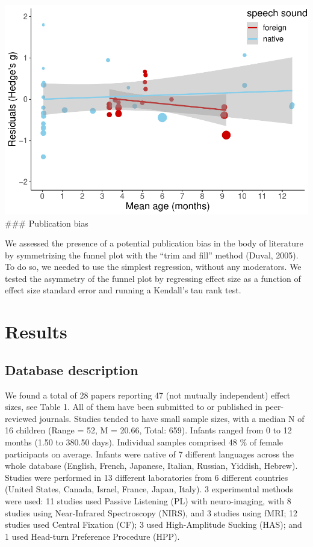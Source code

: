 \documentclass[man]{apa6}
\begin{document}
\includegraphics{MA_speech_pref_files/figure-latex/residuals-4.pdf}
\#\#\# Publication bias

We assessed the presence of a potential publication bias in the body of
literature by symmetrizing the funnel plot with the \enquote{trim and
fill} method (Duval, 2005). To do so, we needed to use the simplest
regression, without any moderators. We tested the asymmetry of the
funnel plot by regressing effect size as a function of effect size
standard error and running a Kendall's tau rank test.

\section{Results}\label{results}

\subsection{Database description}\label{database-description}

We found a total of 28 papers reporting 47 (not mutually independent)
effect sizes, see Table 1. All of them have been submitted to or
published in peer-reviewed journals. Studies tended to have small sample
sizes, with a median N of 16 children (Range = 52, M = 20.66, Total:
659). Infants ranged from 0 to 12 months (1.50 to 380.50 days).
Individual samples comprised 48 \% of female participants on average.
Infants were native of 7 different languages across the whole database
(English, French, Japanese, Italian, Russian, Yiddish, Hebrew). Studies
were performed in 13 different laboratories from 6 different countries
(United States, Canada, Israel, France, Japan, Italy). 3 experimental
methods were used: 11 studies used Passive Listening (PL) with
neuro-imaging, with 8 studies using Near-Infrared Spectroscopy (NIRS),
and 3 studies using fMRI; 12 studies used Central Fixation (CF); 3 used
High-Amplitude Sucking (HAS); and 1 used Head-turn Preference Procedure
(HPP).
\end{document}
